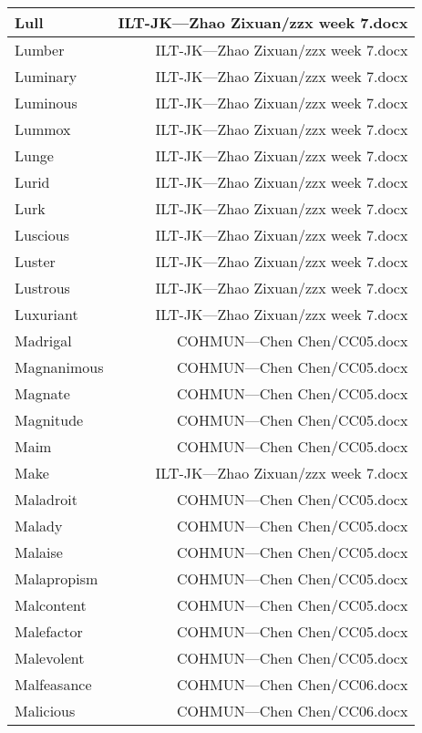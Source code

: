 \documentclass{article}
\begin{document}
\begin{center}
\begin{longtable}{|l|r|}
Lull  &  ILT-JK---Zhao Zixuan/zzx week 7.docx\\  
\hline
Lumber  &  ILT-JK---Zhao Zixuan/zzx week 7.docx\\  
\hline
Luminary  &  ILT-JK---Zhao Zixuan/zzx week 7.docx\\  
\hline
Luminous  &  ILT-JK---Zhao Zixuan/zzx week 7.docx\\  
\hline
Lummox  &  ILT-JK---Zhao Zixuan/zzx week 7.docx\\  
\hline
Lunge  &  ILT-JK---Zhao Zixuan/zzx week 7.docx\\  
\hline
Lurid  &  ILT-JK---Zhao Zixuan/zzx week 7.docx\\  
\hline
Lurk  &  ILT-JK---Zhao Zixuan/zzx week 7.docx\\  
\hline
Luscious  &  ILT-JK---Zhao Zixuan/zzx week 7.docx\\  
\hline
Luster  &  ILT-JK---Zhao Zixuan/zzx week 7.docx\\  
\hline
Lustrous  &  ILT-JK---Zhao Zixuan/zzx week 7.docx\\  
\hline
Luxuriant  &  ILT-JK---Zhao Zixuan/zzx week 7.docx\\  
\hline
Madrigal  &  COHMUN---Chen Chen/CC05.docx\\  
\hline
Magnanimous  &  COHMUN---Chen Chen/CC05.docx\\  
\hline
Magnate  &  COHMUN---Chen Chen/CC05.docx\\  
\hline
Magnitude  &  COHMUN---Chen Chen/CC05.docx\\  
\hline
Maim  &  COHMUN---Chen Chen/CC05.docx\\  
\hline
Make  &  ILT-JK---Zhao Zixuan/zzx week 7.docx\\  
\hline
Maladroit  &  COHMUN---Chen Chen/CC05.docx\\  
\hline
Malady  &  COHMUN---Chen Chen/CC05.docx\\  
\hline
Malaise  &  COHMUN---Chen Chen/CC05.docx\\  
\hline
Malapropism  &  COHMUN---Chen Chen/CC05.docx\\  
\hline
Malcontent  &  COHMUN---Chen Chen/CC05.docx\\  
\hline
Malefactor  &  COHMUN---Chen Chen/CC05.docx\\  
\hline
Malevolent  &  COHMUN---Chen Chen/CC05.docx\\  
\hline
Malfeasance  &  COHMUN---Chen Chen/CC06.docx\\  
\hline
Malicious  &  COHMUN---Chen Chen/CC06.docx\\  
\hline

\end{longtable}
\end{center}
\end{document}
